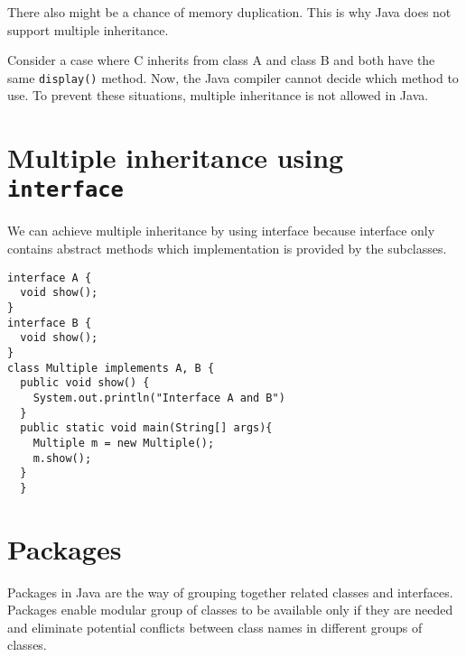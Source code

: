 \documentclass[a4paper, 12pt]{scrarticle}
\begin{document}
There also might be a chance of memory duplication. This is why Java does not support multiple inheritance.

Consider a case where C inherits from class A and class B  and both have the same \verb+display()+ method. Now, the Java compiler cannot decide which method to use. To prevent these situations, multiple inheritance is not allowed in Java.
\vskip200pt

\section{Multiple inheritance using \texttt{interface}}
We can achieve multiple inheritance by using interface because interface only contains abstract methods which implementation is provided by the subclasses.
\begin{verbatim}
interface A {
  void show();
}
interface B {
  void show();
}
class Multiple implements A, B {
  public void show() {
    System.out.println("Interface A and B")
  }
  public static void main(String[] args){
    Multiple m = new Multiple();
    m.show();
  }
  }
\end{verbatim}

\section{Packages}
Packages in Java are the way of grouping together related classes and interfaces. Packages enable modular group of classes to be available only if they are needed and eliminate potential conflicts between class names in different groups of classes.
\end{document}

